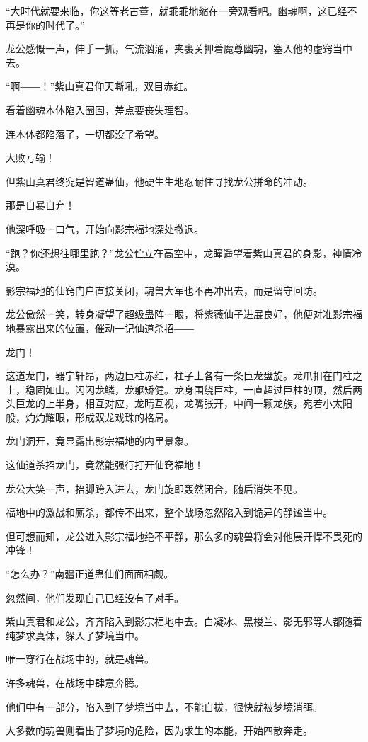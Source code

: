 \begin{this_body}
“大时代就要来临，你这等老古董，就乖乖地缩在一旁观看吧。幽魂啊，这已经不再是你的时代了。”

龙公感慨一声，伸手一抓，气流汹涌，夹裹关押着魔尊幽魂，塞入他的虚窍当中去。

“啊――！”紫山真君仰天嘶吼，双目赤红。

看着幽魂本体陷入囹圄，差点要丧失理智。

连本体都陷落了，一切都没了希望。

大败亏输！

但紫山真君终究是智道蛊仙，他硬生生地忍耐住寻找龙公拼命的冲动。

那是自暴自弃！

他深呼吸一口气，开始向影宗福地深处撤退。

“跑？你还想往哪里跑？”龙公伫立在高空中，龙瞳遥望着紫山真君的身影，神情冷漠。

影宗福地的仙窍门户直接关闭，魂兽大军也不再冲出去，而是留守回防。

龙公傲然一笑，转身凝望了超级蛊阵一眼，将紫薇仙子进展良好，他便对准影宗福地暴露出来的位置，催动一记仙道杀招――

龙门！

这道龙门，器宇轩昂，两边巨柱赤红，柱子上各有一条巨龙盘旋。龙爪扣在门柱之上，稳固如山。闪闪龙鳞，龙躯矫健。龙身围绕巨柱，一直超过巨柱的顶，然后两头巨龙的上半身，相互对应，龙睛互视，龙嘴张开，中间一颗龙族，宛若小太阳般，灼灼耀眼，形成双龙戏珠的格局。

龙门洞开，竟显露出影宗福地的内里景象。

这仙道杀招龙门，竟然能强行打开仙窍福地！

龙公大笑一声，抬脚跨入进去，龙门旋即轰然闭合，随后消失不见。

福地中的激战和厮杀，都传不出来，整个战场忽然陷入到诡异的静谧当中。

但可想而知，龙公进入影宗福地绝不平静，那么多的魂兽将会对他展开悍不畏死的冲锋！

“怎么办？”南疆正道蛊仙们面面相觑。

忽然间，他们发现自己已经没有了对手。

紫山真君和龙公，齐齐陷入到影宗福地中去。白凝冰、黑楼兰、影无邪等人都随着纯梦求真体，躲入了梦境当中。

唯一穿行在战场中的，就是魂兽。

许多魂兽，在战场中肆意奔腾。

他们中有一部分，陷入到了梦境当中去，不能自拔，很快就被梦境消弭。

大多数的魂兽则看出了梦境的危险，因为求生的本能，开始四散奔走。


\end{this_body}
